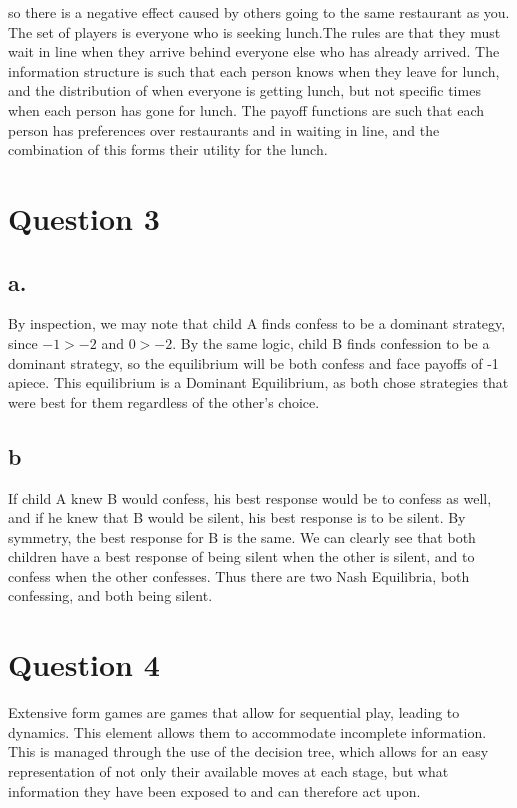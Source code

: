 \documentclass[12pt]{paper}
\begin{document}
so there is a negative effect caused by others going to the same restaurant as
you. The set of players is everyone who is seeking lunch.\newline The rules are that
they must wait in line when they arrive behind everyone else who has already
arrived. \newline The information structure is such that each person knows when they
leave for lunch, and the distribution of when everyone is getting lunch, but not
specific times when each person has gone for lunch. \newline The payoff functions are
such that each person has preferences over restaurants and in waiting in line,
and the combination of this forms their utility for the lunch.

\section*{Question 3}

\subsection*{a.}

By inspection, we may note that child A finds confess to be a dominant strategy,
since $-1 > -2$ and $0 > -2$. By the same logic, child B finds confession to be
a dominant strategy, so the equilibrium will be both confess and face payoffs of
-1 apiece. This equilibrium is a Dominant Equilibrium, as both chose strategies
that were best for them regardless of the other's choice.

\subsection*{b}

If child A knew B would confess, his best response would be to confess as well,
and if he knew that B would be silent, his best response is to be silent. By
symmetry, the best response for B is the same. We can clearly see that both
children have a best response of being silent when the other is silent, and to
confess when the other confesses. Thus there are two Nash Equilibria, both
confessing, and both being silent.

\section*{Question 4}

Extensive form games are games that allow for sequential play, leading to
dynamics. This element allows them to accommodate incomplete
information. This is managed through the use of the decision tree, which allows
for an easy representation of not only their available moves at each stage, but
what information they have been exposed to and can therefore act upon.
\end{document}
